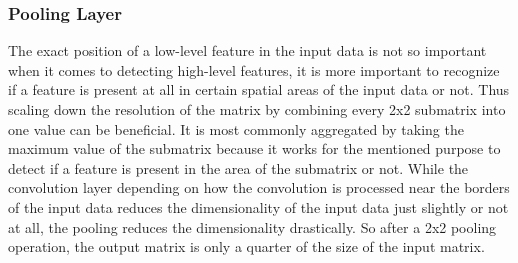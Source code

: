 \subsubsection*{Pooling Layer}

The exact position of a low-level feature in the input data is not so important when it comes to detecting high-level features,
it is more important to recognize if a feature is present at all in certain spatial areas of the input data or not.
Thus scaling down the resolution of the matrix by combining every 2x2 submatrix into one value can be beneficial.
It is most commonly aggregated by taking the maximum value of the submatrix because it works for the mentioned purpose to detect if a feature is present in the area of the submatrix or not. While the convolution layer depending on how the convolution is processed near the borders of the input data reduces the dimensionality of the input data just slightly or not at all, the pooling reduces the dimensionality drastically. So after a 2x2 pooling operation, the output matrix is only a quarter of the size of the input matrix.

